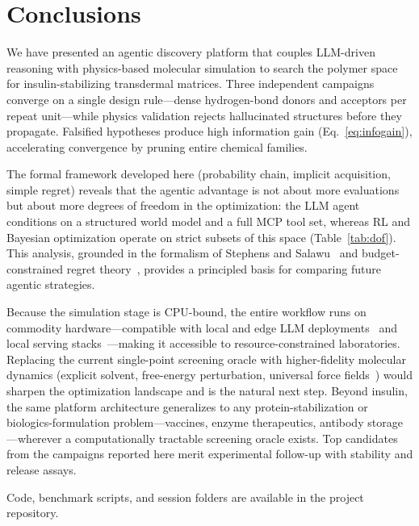 \documentclass[twocolumn]{fairmeta}
\begin{document}
\section{Conclusions}

We have presented an agentic discovery platform that couples LLM-driven reasoning with physics-based molecular simulation to search the polymer space for insulin-stabilizing transdermal matrices.
Three independent campaigns converge on a single design rule---dense hydrogen-bond donors and acceptors per repeat unit---while physics validation rejects hallucinated structures before they propagate.
Falsified hypotheses produce high information gain (Eq.~\ref{eq:infogain}), accelerating convergence by pruning entire chemical families.

The formal framework developed here (probability chain, implicit acquisition, simple regret) reveals that the agentic advantage is not about more evaluations but about more degrees of freedom in the optimization: the LLM agent conditions on a structured world model and a full MCP tool set, whereas RL and Bayesian optimization operate on strict subsets of this space (Table~\ref{tab:dof}).
This analysis, grounded in the formalism of Stephens and Salawu~\cite{stephens2025mathframing} and budget-constrained regret theory~\cite{shahriari2016bayesopt}, provides a principled basis for comparing future agentic strategies.

Because the simulation stage is CPU-bound, the entire workflow runs on commodity hardware---compatible with local and edge LLM deployments~\cite{xu2024ondevice,qu2024mobileedge} and local serving stacks~\cite{ollama2023}---making it accessible to resource-constrained laboratories.
Replacing the current single-point screening oracle with higher-fidelity molecular dynamics (explicit solvent, free-energy perturbation, universal force fields~\cite{wood2025uma}) would sharpen the optimization landscape and is the natural next step.
Beyond insulin, the same platform architecture generalizes to any protein-stabilization or biologics-formulation problem---vaccines, enzyme therapeutics, antibody storage---wherever a computationally tractable screening oracle exists.
Top candidates from the campaigns reported here merit experimental follow-up with stability and release assays.

Code, benchmark scripts, and session folders are available in the project repository.
\end{document}
